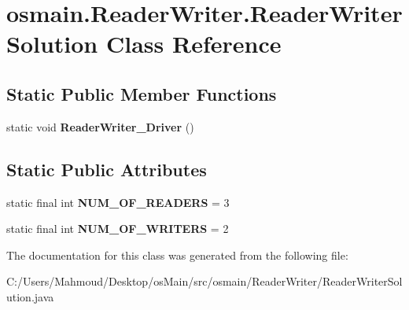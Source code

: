 \hypertarget{classosmain_1_1_reader_writer_1_1_reader_writer_solution}{}\section{osmain.\+Reader\+Writer.\+Reader\+Writer\+Solution Class Reference}
\label{classosmain_1_1_reader_writer_1_1_reader_writer_solution}
\subsection*{Static Public Member Functions}
\begin{DoxyCompactItemize}
\item 
static void {\bfseries Reader\+Writer\+\_\+\+Driver} ()\hypertarget{classosmain_1_1_reader_writer_1_1_reader_writer_solution_abf49a316fecfbbcfc8ab12d8ff3c41b6}{}\label{classosmain_1_1_reader_writer_1_1_reader_writer_solution_abf49a316fecfbbcfc8ab12d8ff3c41b6}

\end{DoxyCompactItemize}
\subsection*{Static Public Attributes}
\begin{DoxyCompactItemize}
\item 
static final int {\bfseries N\+U\+M\+\_\+\+O\+F\+\_\+\+R\+E\+A\+D\+E\+RS} = 3\hypertarget{classosmain_1_1_reader_writer_1_1_reader_writer_solution_accf87251312f91bf47321d076c5c2738}{}\label{classosmain_1_1_reader_writer_1_1_reader_writer_solution_accf87251312f91bf47321d076c5c2738}

\item 
static final int {\bfseries N\+U\+M\+\_\+\+O\+F\+\_\+\+W\+R\+I\+T\+E\+RS} = 2\hypertarget{classosmain_1_1_reader_writer_1_1_reader_writer_solution_a210be7b65bd0b387d4a2bd99070da5b5}{}\label{classosmain_1_1_reader_writer_1_1_reader_writer_solution_a210be7b65bd0b387d4a2bd99070da5b5}

\end{DoxyCompactItemize}


The documentation for this class was generated from the following file\+:\begin{DoxyCompactItemize}
\item 
C\+:/\+Users/\+Mahmoud/\+Desktop/os\+Main/src/osmain/\+Reader\+Writer/Reader\+Writer\+Solution.\+java\end{DoxyCompactItemize}
